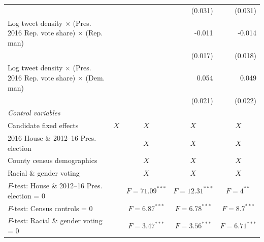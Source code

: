 \documentclass[manuscript,screen,nonacm,11pt,acm]{acmart}
\begin{document}
\begin{table}[tbp]
\begin{adjustbox}{max width=1\textwidth}
\begin{tabular}{@{\hspace{0\tabcolsep}}l*{4}{D{.}{.}{-1}}@{\hspace{0\tabcolsep}}}
          &                  &                  &  (0.031)         &  (0.031)         \\
Log tweet density $ \times $ (Pres. 2016 Rep. vote share) $ \times $ (Rep. man)  &                  &                  &   -0.011         &   -0.014         \\
          &                  &                  &  (0.017)         &  (0.018)         \\
Log tweet density $ \times $ (Pres. 2016 Rep. vote share) $ \times $ (Dem. man)  &                  &                  &    0.054\sym{**} &    0.049\sym{**} \\
          &                  &                  &  (0.021)         &  (0.022)         \\
\emph{Control variables}&                  &                  &                  &                  \\
\hspace{1em}Candidate fixed effects&         &         &         &         \\
\hspace{1em}2016 House \& 2012--16 Pres. election&                  &         &         &         \\
\hspace{1em}County census demographics&                  &         &         &         \\
\hspace{1em}Racial \& gender voting&                  &         &         &         \\
$ F $-test: House \& 2012--16 Pres. election = 0&                  &         &         &         \\
$ F $-test: Census controls = 0&                  &         &         &         \\
$ F $-test: Racial \& gender voting = 0&                  &         &         &         \\

\end{tabular}
\end{adjustbox}
\end{table}
\end{document}
